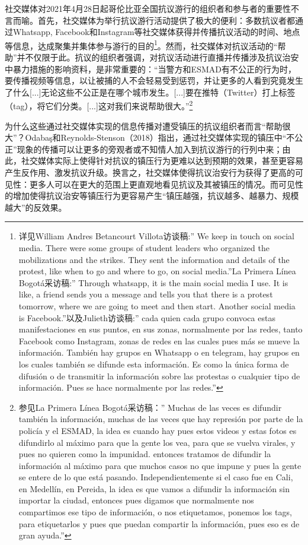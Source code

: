 \documentclass{phyasgn}\usepackage{nag}
\begin{document}
\par 社交媒体对2021年4月28日起哥伦比亚全国抗议游行的组织者和参与者的重要性不言而喻。首先，社交媒体为举行抗议游行活动提供了极大的便利：多数抗议者都通过Whatsapp, Facebook和Instagram等社交媒体获得并传播抗议活动的时间、地点等信息，达成聚集并集体参与游行的目的\footnote[69]{详见William Andres Betancourt Villota访谈稿:” We keep in touch on social media. There were some groups of student leaders who organized the mobilizations and the strikes. They sent the information and details of the protest, like when to go and where to go, on social media.”La Primera Línea Bogotá采访稿:” Through whatsapp, it is the main social media I use. It is like, a friend sends you a message and tells you that there is a protest tomorrow, where we are going to meet and then start. Another social media is Facebook.”以及Julieth访谈稿:” cada quien cada grupo convoca estas manifestaciones en sus puntos, en sus zonas, normalmente por las redes, tanto Facebook como Instagram, zonas de redes en las cuales pues más se mueve la información. También hay grupos en Whatsapp o en telegram, hay grupos en los cuales también se difunde esta información. Es como la única forma de difusión o de transmitir la información sobre las protestas o cualquier tipo de información. Pues se hace normalmente por las redes.”}。然而，社交媒体对抗议活动的“帮助”并不仅限于此。抗议的组织者强调，对抗议活动进行直播并传播涉及抗议治安中暴力措施的影响资料，是非常重要的：“当警方和ESMAD有不公正的行为时，要传播视频等信息，以让被捕的人不会轻易受到惩罚，并让更多的人看到究竟发生了什么[...]无论这些不公正是在哪个城市发生。[...]要在推特（Twitter）打上标签（tag），将它们分类。[...]这对我们来说帮助很大。”\footnote[70]{参见La Primera Línea Bogotá采访稿：” Muchas de las veces es difundir también la información, muchas de las veces que hay represión por parte de la policía y el ESMAD, la idea es cuando hay pues estos videos y estas fotos es difundirlo al máximo para que la gente los vea, para que se vuelva virales, y pues no quieren como la impunidad. entonces tratamos de difundir la información al máximo para que muchos casos no que impune y pues la gente se entere de lo que está pasando. Independientemente si el caso fue en Cali, en Medellín, en Pereida, la idea es que vamos a difundir la información sin importar la ciudad, entonces pues digamos que normalmente nos compartimos ese tipo de información, o nos etiquetamos, ponemos los tags, para etiquetarlos y pues que puedan compartir la información, pues eso es de gran ayuda.”}
\par 为什么这些通过社交媒体实现的信息传播对遭受镇压的抗议组织者而言“帮助很大”？Odabaş和Reynolds-Stenson（2018）指出，通过社交媒体实现的镇压中“不公正”现象的传播可以让更多的旁观者或不知情人加入到抗议游行的行列中来；由此，社交媒体实际上使得针对抗议的镇压行为更难以达到预期的效果，甚至更容易产生反作用、激发抗议升级。换言之，社交媒体使得抗议治安行为获得了更高的可见性：更多人可以在更大的范围上更直观地看见抗议及其被镇压的情况。而可见性的增加使得抗议治安等镇压行为更容易产生“镇压越强，抗议越多、越暴力、规模越大”的反效果。
\end{document}
